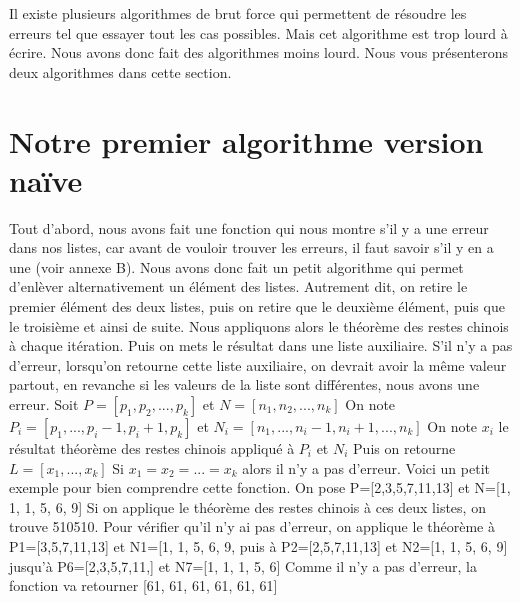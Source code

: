 \documentclass[a4paper, 11pt]{report}
\begin{document}
Il existe plusieurs algorithmes de brut force qui permettent de résoudre les erreurs tel que essayer tout les cas possibles. Mais cet algorithme est trop lourd à écrire. Nous avons donc fait des algorithmes moins lourd.
Nous vous présenterons deux algorithmes dans cette section.

\section{Notre premier algorithme version naïve }
Tout d'abord, nous avons fait une fonction qui nous montre s'il y a une erreur dans nos listes, car avant de vouloir trouver les erreurs, il faut savoir s'il y en a une (voir annexe B).
Nous avons donc fait un petit algorithme qui permet d'enlèver alternativement un élément des listes. Autrement dit, on retire le premier élément des deux listes, puis on retire que le deuxième élément, puis que le troisième et ainsi de suite. Nous appliquons alors le théorème des restes chinois à chaque itération. Puis on mets le résultat dans une liste auxiliaire. S'il n'y a pas d'erreur,
lorsqu'on retourne cette liste auxiliaire, on devrait avoir la même valeur partout, en revanche si les valeurs de la liste sont différentes, nous avons une erreur. \newline
\newline
Soit $P=[p_1 , p_2, ... , p_k]$ et $N=[n_1, n_2, ..., n_k]$ \newline
On note $P_i = [p_1,..., p_i-1, p_i+1, p_k]$ et $N_i=[n_1,..., n_i-1, n_i+1, ... , n_k]$ \newline
On note $x_i$ le résultat théorème des restes chinois appliqué à $P_i$ et $N_i$ \newline
Puis on retourne 
$L=[x_1, ..., x_k]$ \newline
Si 
$x_1=x_2=...=x_k$ 
alors il n'y a pas d'erreur. \newline
\newline
Voici un petit exemple pour bien comprendre cette fonction.\newline
On pose P=[2,3,5,7,11,13] et N=[1, 1, 1, 5, 6, 9] \newline
Si on applique le théorème des restes chinois à ces deux listes, on trouve 510510. Pour vérifier qu'il n'y ai pas d'erreur, on applique le théorème à
P1=[3,5,7,11,13] et N1=[1, 1, 5, 6, 9, puis à P2=[2,5,7,11,13] et N2=[1, 1, 5, 6, 9] jusqu'à P6=[2,3,5,7,11,] et N7=[1, 1, 1, 5, 6]\newline
Comme il n'y a pas d'erreur, la fonction va retourner [61, 61, 61, 61, 61, 61] \newline
\end{document}
